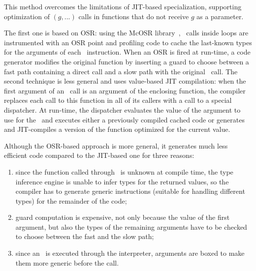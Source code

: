 This method overcomes the limitations of JIT-based specialization, supporting optimization of \feval$(g,...)$ calls in functions that do not receive $g$ as a parameter. 
\fi

\ifdefined\fullver
The first one is based on OSR: using the McOSR library~\cite{lameed2013modular}, \feval\ calls inside loops are instrumented with an OSR point and profiling code to cache the last-known types for the arguments of each \feval\ instruction. When an OSR is fired at run-time, a code generator modifies the original function by inserting a guard to choose between a fast path containing a direct call and a slow path with the original \feval\ call. The second technique is less general and uses value-based JIT compilation: when the first argument of an \feval\ call is an argument of the enclosing function, the compiler replaces each call to this function in all of its callers with a call to a special dispatcher. At run-time, the dispatcher evaluates the value of the argument to use for the \feval\ and executes either a previously compiled cached code or generates and JIT-compiles a version of the function optimized for the current value.

Although the OSR-based approach is more general, it generates much less efficient code compared to the JIT-based one for three reasons:
\begin{enumerate}
\item since the function called through \feval\ is unknown at compile time, the type inference engine is unable to infer types for the returned values, so the compiler has to generate generic instructions (suitable for handling different types) for the remainder of the code;
\item guard computation is expensive, not only because the value of the first argument, but also the types of the remaining arguments have to be checked to choose between the fast and the slow path;
\item since an \feval\ is executed through the interpreter, arguments are boxed to make them more generic before the call.
\end{enumerate}

